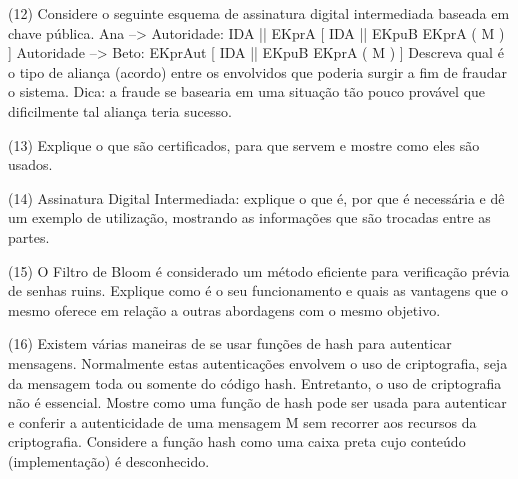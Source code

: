 \documentclass[10pt,a4paper]{report}
\begin{document}
(12) Considere o seguinte esquema de assinatura digital intermediada baseada em chave pública.
Ana --> Autoridade: IDA || EKprA [ IDA || EKpuB { EKprA ( M ) } ]
Autoridade --> Beto: EKprAut [ IDA || EKpuB { EKprA ( M ) } ]
Descreva qual é o tipo de aliança (acordo) entre os envolvidos que poderia surgir a fim de fraudar o sistema. Dica: a fraude se basearia em uma situação tão pouco provável que dificilmente tal aliança teria sucesso.

(13) Explique o que são certificados, para que servem e mostre como eles são usados.

(14) Assinatura Digital Intermediada: explique o que é, por que é necessária e dê um exemplo de utilização, mostrando as informações que são trocadas entre as partes.

(15) O Filtro de Bloom é considerado um método eficiente para verificação prévia de senhas ruins. Explique como é o seu funcionamento e quais as vantagens que o mesmo oferece em relação a outras abordagens com o mesmo objetivo.

(16) Existem várias maneiras de se usar funções de hash para autenticar mensagens. Normalmente estas autenticações envolvem o uso de criptografia, seja da mensagem toda ou somente do código hash. Entretanto, o uso de criptografia não é essencial. Mostre como uma função de hash pode ser usada para autenticar e conferir a autenticidade de uma mensagem M sem recorrer aos recursos da criptografia. Considere a função hash como uma caixa preta cujo conteúdo (implementação) é desconhecido.
\end{document}
